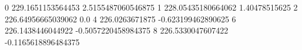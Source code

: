 0 229.1651153564453 2.5155487060546875
1 228.05435180664062 1.40478515625
2 226.64956665039062 0.0
4 226.0263671875 -0.623199462890625
6 226.1438446044922 -0.5057220458984375
8 226.5330047607422 -0.1165618896484375
